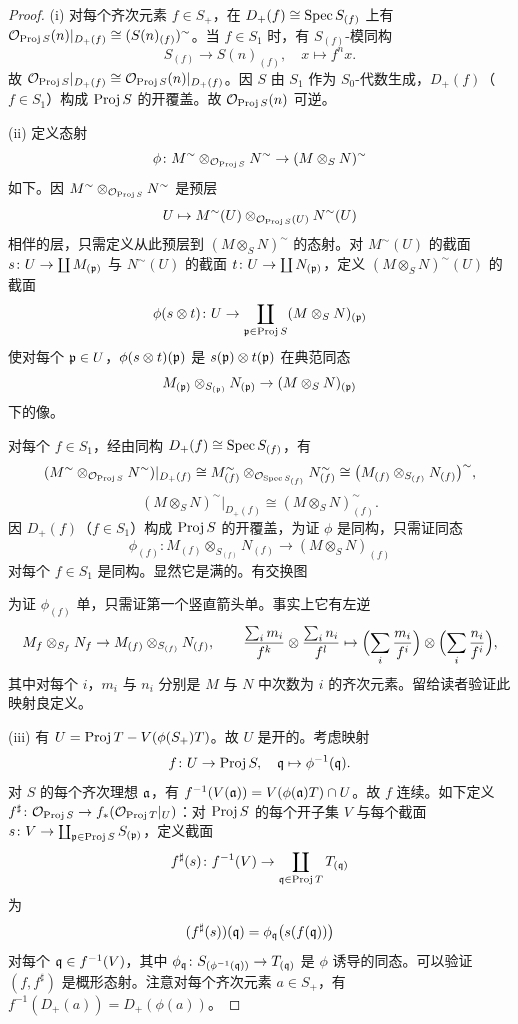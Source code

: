 \begin{proof}
(i) 对每个齐次元素 $f\in S_+$，在 $D_+(f)\cong\operatorname{Spec} S_{(f)}$ 上有 $\mathcal{O}_{\operatorname{Proj} S}(n)|_{D_+(f)}\cong(S(n)_{(f)})^\sim$。当 $f\in S_1$ 时，有 $S_{(f)}$-模同构
\[
S_{(f)}\to S(n)_{(f)},\quad x\mapsto f^nx.
\]
故 $\mathcal{O}_{\operatorname{Proj} S}|_{D_+(f)}\cong\mathcal{O}_{\operatorname{Proj} S}(n)|_{D_+(f)}$。因 $S$ 由 $S_1$ 作为 $S_0$-代数生成，$D_+(f)$（$f\in S_1$）构成 $\operatorname{Proj} S$ 的开覆盖。故 $\mathcal{O}_{\operatorname{Proj} S}(n)$ 可逆。

(ii) 定义态射
\[
\phi\colon M^\sim\otimes_{\mathcal{O}_{\operatorname{Proj} S}}N^\sim\to(M\otimes_SN)^\sim
\]
如下。因 $M^\sim\otimes_{\mathcal{O}_{\operatorname{Proj} S}}N^\sim$ 是预层
\[
U\mapsto M^\sim(U)\otimes_{\mathcal{O}_{\operatorname{Proj} S}(U)}N^\sim(U)
\]
相伴的层，只需定义从此预层到 $(M\otimes_SN)^\sim$ 的态射。对 $M^\sim(U)$ 的截面 $s\colon U\to\coprod M_{(\mathfrak{p})}$ 与 $N^\sim(U)$ 的截面 $t\colon U\to\coprod N_{(\mathfrak{p})}$，定义 $(M\otimes_SN)^\sim(U)$ 的截面
\[
\phi(s\otimes t)\colon U\to\coprod_{\mathfrak{p}\in\operatorname{Proj} S}(M\otimes_SN)_{(\mathfrak{p})}
\]
使对每个 $\mathfrak{p}\in U$，$\phi(s\otimes t)(\mathfrak{p})$ 是 $s(\mathfrak{p})\otimes t(\mathfrak{p})$ 在典范同态
\[
M_{(\mathfrak{p})}\otimes_{S_{(\mathfrak{p})}}N_{(\mathfrak{p})}\to(M\otimes_SN)_{(\mathfrak{p})}
\]
下的像。

对每个 $f\in S_1$，经由同构 $D_+(f)\cong\operatorname{Spec} S_{(f)}$，有
\[
(M^\sim\otimes_{\mathcal{O}_{\operatorname{Proj} S}}N^\sim)|_{D_+(f)}\cong M_{(f)}^\sim\otimes_{\mathcal{O}_{\operatorname{Spec} S_{(f)}}}N_{(f)}^\sim\cong\bigl(M_{(f)}\otimes_{S_{(f)}}N_{(f)}\bigr)^\sim,
\]
\[
(M\otimes_SN)^\sim|_{D_+(f)}\cong(M\otimes_SN)_{(f)}^\sim.
\]
因 $D_+(f)$（$f\in S_1$）构成 $\operatorname{Proj} S$ 的开覆盖，为证 $\phi$ 是同构，只需证同态
\[
\phi_{(f)}\colon M_{(f)}\otimes_{S_{(f)}}N_{(f)}\to(M\otimes_SN)_{(f)}
\]
对每个 $f\in S_1$ 是同构。显然它是满的。有交换图
\begin{center}
\end{center}
为证 $\phi_{(f)}$ 单，只需证第一个竖直箭头单。事实上它有左逆
\[
M_f\otimes_{S_f}N_f\to M_{(f)}\otimes_{S_{(f)}}N_{(f)},\qquad
\frac{\sum_im_i}{f^k}\otimes\frac{\sum_in_i}{f^l}\mapsto\Bigl(\sum_i\frac{m_i}{f^i}\Bigr)\otimes\Bigl(\sum_i\frac{n_i}{f^i}\Bigr),
\]
其中对每个 $i$，$m_i$ 与 $n_i$ 分别是 $M$ 与 $N$ 中次数为 $i$ 的齐次元素。留给读者验证此映射良定义。

(iii) 有 $U=\operatorname{Proj} T-V(\phi(S_+)T)$。故 $U$ 是开的。考虑映射
\[
f\colon U\to\operatorname{Proj} S,\quad\mathfrak{q}\mapsto\phi^{-1}(\mathfrak{q}).
\]
对 $S$ 的每个齐次理想 $\mathfrak{a}$，有 $f^{-1}(V(\mathfrak{a}))=V(\phi(\mathfrak{a})T)\cap U$。故 $f$ 连续。如下定义 $f^\sharp\colon\mathcal{O}_{\operatorname{Proj} S}\to f_*(\mathcal{O}_{\operatorname{Proj} T}|_U)$：对 $\operatorname{Proj} S$ 的每个开子集 $V$ 与每个截面 $s\colon V\to\coprod_{\mathfrak{p}\in\operatorname{Proj} S}S_{(\mathfrak{p})}$，定义截面
\[
f^\sharp(s)\colon f^{-1}(V)\to\coprod_{\mathfrak{q}\in\operatorname{Proj} T}T_{(\mathfrak{q})}
\]
为
\[
(f^\sharp(s))(\mathfrak{q})=\phi_{\mathfrak{q}}\bigl(s(f(\mathfrak{q}))\bigr)
\]
对每个 $\mathfrak{q}\in f^{-1}(V)$，其中 $\phi_{\mathfrak{q}}\colon S_{(\phi^{-1}(\mathfrak{q}))}\to T_{(\mathfrak{q})}$ 是 $\phi$ 诱导的同态。可以验证 $(f,f^\sharp)$ 是概形态射。注意对每个齐次元素 $a\in S_+$，有 $f^{-1}(D_+(a))=D_+(\phi(a))$。


\end{proof}
